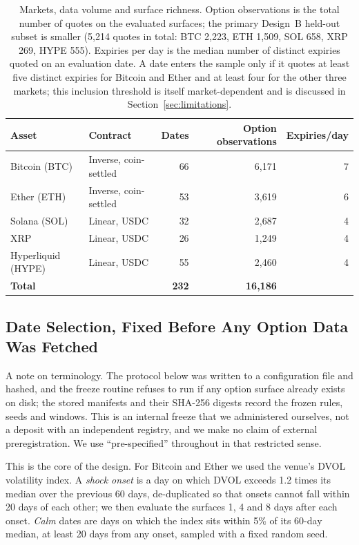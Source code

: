 \documentclass[runningheads]{llncs}
\begin{document}
\begin{table}[htbp]
\centering
\caption{Markets, data volume and surface richness. Option observations is
the total number of quotes on the evaluated surfaces; the primary Design~B
held-out subset is smaller (5,214 quotes in total: BTC 2,223, ETH 1,509,
SOL 658, XRP 269, HYPE 555). Expiries per day is the median number of distinct
expiries quoted on an evaluation date. A date enters the sample only if it
quotes at least five distinct expiries for Bitcoin and Ether and at least four
for the other three markets; this inclusion threshold is itself
market-dependent and is discussed in Section~\ref{sec:limitations}.}
\label{tab:markets}
\begin{tabular}{llrrr}
\toprule
Asset & Contract & Dates & Option observations & Expiries/day \\
\midrule
Bitcoin (BTC)      & Inverse, coin-settled & 66 & 6{,}171 & 7 \\
Ether (ETH)        & Inverse, coin-settled & 53 & 3{,}619 & 6 \\
Solana (SOL)       & Linear, USDC          & 32 & 2{,}687 & 4 \\
XRP                & Linear, USDC          & 26 & 1{,}249 & 4 \\
Hyperliquid (HYPE) & Linear, USDC          & 55 & 2{,}460 & 4 \\
\midrule
\textbf{Total}     &                       & \textbf{232} & \textbf{16{,}186} & \\
\bottomrule
\end{tabular}
\end{table}

\subsection{Date Selection, Fixed Before Any Option Data Was Fetched}

A note on terminology. The protocol below was written to a configuration file
and hashed, and the freeze routine refuses to run if any option surface
already exists on disk; the stored manifests and their SHA-256 digests record
the frozen rules, seeds and windows. This is an internal freeze that we
administered ourselves, not a deposit with an independent registry, and we
make no claim of external preregistration. We use ``pre-specified'' throughout
in that restricted sense.

This is the core of the design. For Bitcoin and Ether we used the venue's DVOL
volatility index. A \emph{shock onset} is a day on which DVOL exceeds 1.2 times
its median over the previous 60 days, de-duplicated so that onsets cannot fall
within 20 days of each other; we then evaluate the surfaces 1, 4 and 8 days
after each onset. \emph{Calm} dates are days on which the index sits within 5\%
of its 60-day median, at least 20 days from any onset, sampled with a fixed
random seed.
\end{document}
